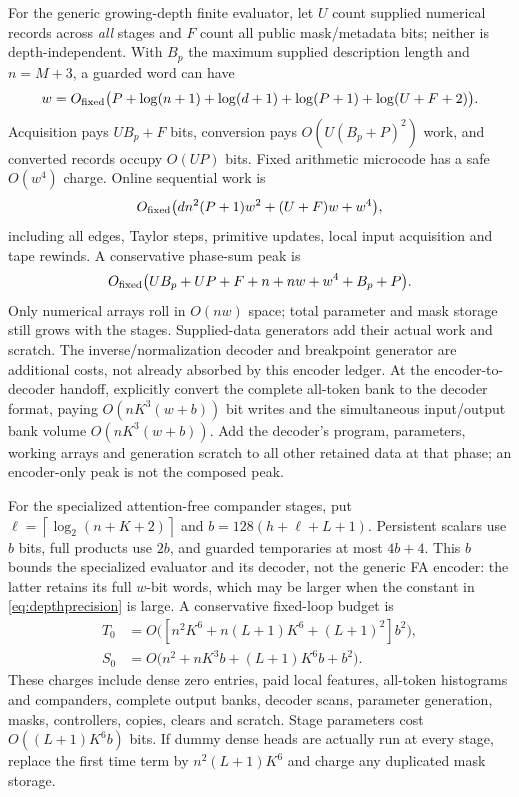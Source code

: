 \documentclass[11pt,letterpaper]{article}
\theoremstyle{definition}\newtheorem{definition}[theorem]{Definition}
\theoremstyle{remark}\newtheorem{remark}[theorem]{Remark}
\newcommand{\ceil}[1]{\left\lceil #1\right\rceil}
\begin{document}
For the generic growing-depth finite evaluator, let $U$ count supplied numerical records across \emph{all} stages and $F$ count all public mask/metadata bits; neither is depth-independent. With $B_p$ the maximum supplied description length and $n=M+3$, a guarded word can have
\[
 w=O_{\rm fixed}\bigl(P+\log(n+1)+\log(d+1)+\log(P+1)+\log(U+F+2)\bigr).
\]
Acquisition pays $UB_p+F$ bits, conversion pays $O(U(B_p+P)^2)$ work, and converted records occupy $O(UP)$ bits. Fixed arithmetic microcode has a safe $O(w^4)$ charge. Online sequential work is
\[
 O_{\rm fixed}\bigl(dn^2(P+1)w^2+(U+F)w+w^4\bigr),
\]
including all edges, Taylor steps, primitive updates, local input acquisition and tape rewinds. A conservative phase-sum peak is
\[
 O_{\rm fixed}\bigl(UB_p+UP+F+n+nw+w^4+B_p+P\bigr).
\]
Only numerical arrays roll in $O(nw)$ space; total parameter and mask storage still grows with the stages. Supplied-data generators add their actual work and scratch. The inverse/normalization decoder and breakpoint generator are additional costs, not already absorbed by this encoder ledger. At the encoder-to-decoder handoff, explicitly convert the complete all-token bank to the decoder format, paying $O(nK^3(w+b))$ bit writes and the simultaneous input/output bank volume $O(nK^3(w+b))$. Add the decoder's program, parameters, working arrays and generation scratch to all other retained data at that phase; an encoder-only peak is not the composed peak.

For the specialized attention-free compander stages, put
$\ell=\ceil{\log_2(n+K+2)}$ and $b=128(h+\ell+L+1)$.
Persistent scalars use $b$ bits, full products use $2b$, and guarded temporaries at most $4b+4$. This $b$ bounds the specialized evaluator and its decoder, not the generic FA encoder: the latter retains its full $w$-bit words, which may be larger when the constant in \eqref{eq:depthprecision} is large. A conservative fixed-loop budget is
\begin{equation}\label{eq:compandercost}
 \begin{aligned}
 T_0&=O\bigl([n^2K^6+n(L+1)K^6+(L+1)^2]b^2\bigr),\\
 S_0&=O\bigl(n^2+nK^3b+(L+1)K^6b+b^2\bigr).
 \end{aligned}
\end{equation}
These charges include dense zero entries, paid local features, all-token histograms and companders, complete output banks, decoder scans, parameter generation, masks, controllers, copies, clears and scratch. Stage parameters cost $O((L+1)K^6b)$ bits. If dummy dense heads are actually run at every stage, replace the first time term by $n^2(L+1)K^6$ and charge any duplicated mask storage.
\end{document}
